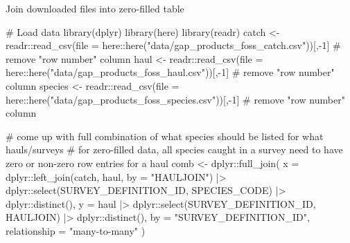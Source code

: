 \documentclass[
  letterpaper,
  oneside,
  open=any]{scrbook}
\newenvironment{Shaded}{\begin{snugshade}}{\end{snugshade}}
\newcommand{\AttributeTok}[1]{\textcolor[rgb]{0.40,0.45,0.13}{#1}}
\newcommand{\CommentTok}[1]{\textcolor[rgb]{0.37,0.37,0.37}{#1}}
\newcommand{\DecValTok}[1]{\textcolor[rgb]{0.68,0.00,0.00}{#1}}
\newcommand{\FunctionTok}[1]{\textcolor[rgb]{0.28,0.35,0.67}{#1}}
\newcommand{\NormalTok}[1]{\textcolor[rgb]{0.00,0.23,0.31}{#1}}
\newcommand{\OtherTok}[1]{\textcolor[rgb]{0.00,0.23,0.31}{#1}}
\newcommand{\SpecialCharTok}[1]{\textcolor[rgb]{0.37,0.37,0.37}{#1}}
\newcommand{\StringTok}[1]{\textcolor[rgb]{0.13,0.47,0.30}{#1}}
\begin{document}
Join downloaded files into zero-filled table

\begin{Shaded}
\begin{Highlighting}[]
\CommentTok{\# Load data}
\FunctionTok{library}\NormalTok{(dplyr)}
\FunctionTok{library}\NormalTok{(here)}
\FunctionTok{library}\NormalTok{(readr)}
\NormalTok{catch }\OtherTok{\textless{}{-}}\NormalTok{ readr}\SpecialCharTok{::}\FunctionTok{read\_csv}\NormalTok{(}\AttributeTok{file =}\NormalTok{ here}\SpecialCharTok{::}\FunctionTok{here}\NormalTok{(}\StringTok{"data/gap\_products\_foss\_catch.csv"}\NormalTok{))[,}\SpecialCharTok{{-}}\DecValTok{1}\NormalTok{] }\CommentTok{\# remove "row number" column}
\NormalTok{haul }\OtherTok{\textless{}{-}}\NormalTok{ readr}\SpecialCharTok{::}\FunctionTok{read\_csv}\NormalTok{(}\AttributeTok{file =}\NormalTok{ here}\SpecialCharTok{::}\FunctionTok{here}\NormalTok{(}\StringTok{"data/gap\_products\_foss\_haul.csv"}\NormalTok{))[,}\SpecialCharTok{{-}}\DecValTok{1}\NormalTok{] }\CommentTok{\# remove "row number" column}
\NormalTok{species }\OtherTok{\textless{}{-}}\NormalTok{ readr}\SpecialCharTok{::}\FunctionTok{read\_csv}\NormalTok{(}\AttributeTok{file =}\NormalTok{ here}\SpecialCharTok{::}\FunctionTok{here}\NormalTok{(}\StringTok{"data/gap\_products\_foss\_species.csv"}\NormalTok{))[,}\SpecialCharTok{{-}}\DecValTok{1}\NormalTok{] }\CommentTok{\# remove "row number" column}

\CommentTok{\# come up with full combination of what species should be listed for what hauls/surveys}
\CommentTok{\# for zero{-}filled data, all species caught in a survey need to have zero or non{-}zero row entries for a haul}
\NormalTok{comb }\OtherTok{\textless{}{-}}\NormalTok{ dplyr}\SpecialCharTok{::}\FunctionTok{full\_join}\NormalTok{(}
  \AttributeTok{x =}\NormalTok{ dplyr}\SpecialCharTok{::}\FunctionTok{left\_join}\NormalTok{(catch, haul, }\AttributeTok{by =} \StringTok{"HAULJOIN"}\NormalTok{) }\SpecialCharTok{|\textgreater{}}
\NormalTok{    dplyr}\SpecialCharTok{::}\FunctionTok{select}\NormalTok{(SURVEY\_DEFINITION\_ID, SPECIES\_CODE) }\SpecialCharTok{|\textgreater{}}
\NormalTok{    dplyr}\SpecialCharTok{::}\FunctionTok{distinct}\NormalTok{(),}
  \AttributeTok{y =}\NormalTok{ haul }\SpecialCharTok{|\textgreater{}}
\NormalTok{    dplyr}\SpecialCharTok{::}\FunctionTok{select}\NormalTok{(SURVEY\_DEFINITION\_ID, HAULJOIN) }\SpecialCharTok{|\textgreater{}}
\NormalTok{    dplyr}\SpecialCharTok{::}\FunctionTok{distinct}\NormalTok{(), }
  \AttributeTok{by =} \StringTok{"SURVEY\_DEFINITION\_ID"}\NormalTok{, }
  \AttributeTok{relationship =} \StringTok{"many{-}to{-}many"}
\NormalTok{)}


\end{Highlighting}
\end{Shaded}
\end{document}
